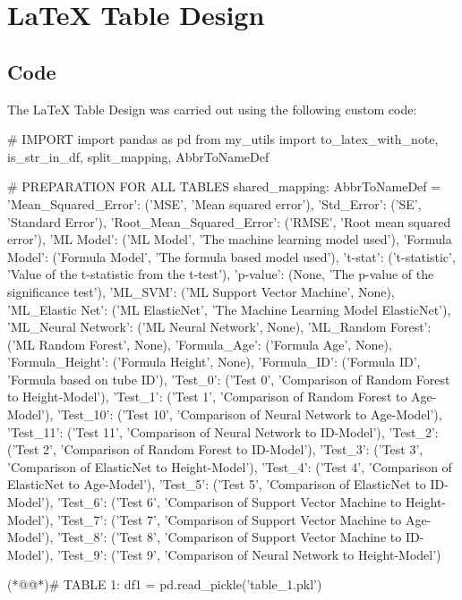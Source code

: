 \documentclass[11pt]{article}
\begin{document}
\section{LaTeX Table Design}
\subsection{{Code}}
The LaTeX Table Design was carried out using the following custom code:

\begin{python}

# IMPORT
import pandas as pd
from my_utils import to_latex_with_note, is_str_in_df, split_mapping, AbbrToNameDef

# PREPARATION FOR ALL TABLES
shared_mapping: AbbrToNameDef = {
    'Mean_Squared_Error': ('MSE', 'Mean squared error'),
    'Std_Error': ('SE', 'Standard Error'),
    'Root_Mean_Squared_Error': ('RMSE', 'Root mean squared error'),
    'ML Model': ('ML Model', 'The machine learning model used'),
    'Formula Model': ('Formula Model', 'The formula based model used'),
    't-stat': ('t-statistic', 'Value of the t-statistic from the t-test'),
    'p-value': (None, 'The p-value of the significance test'),
    'ML_SVM': ('ML Support Vector Machine', None),
    'ML_Elastic Net': ('ML ElasticNet', 'The Machine Learning Model ElasticNet'),
    'ML_Neural Network': ('ML Neural Network', None),
    'ML_Random Forest': ('ML Random Forest', None),
    'Formula_Age': ('Formula Age', None),
    'Formula_Height': ('Formula Height', None),
    'Formula_ID': ('Formula ID', 'Formula based on tube ID'),
    'Test_0': ('Test 0', 'Comparison of Random Forest to Height-Model'),
    'Test_1': ('Test 1', 'Comparison of Random Forest to Age-Model'),
    'Test_10': ('Test 10', 'Comparison of Neural Network to Age-Model'),
    'Test_11': ('Test 11', 'Comparison of Neural Network to ID-Model'),
    'Test_2': ('Test 2', 'Comparison of Random Forest to ID-Model'),
    'Test_3': ('Test 3', 'Comparison of ElasticNet to Height-Model'),
    'Test_4': ('Test 4', 'Comparison of ElasticNet to Age-Model'),
    'Test_5': ('Test 5', 'Comparison of ElasticNet to ID-Model'),
    'Test_6': ('Test 6', 'Comparison of Support Vector Machine to Height-Model'),
    'Test_7': ('Test 7', 'Comparison of Support Vector Machine to Age-Model'),
    'Test_8': ('Test 8', 'Comparison of Support Vector Machine to ID-Model'),
    'Test_9': ('Test 9', 'Comparison of Neural Network to Height-Model')
}

(*@@*)# TABLE 1:
df1 = pd.read_pickle('table_1.pkl')


\end{python}
\end{document}
